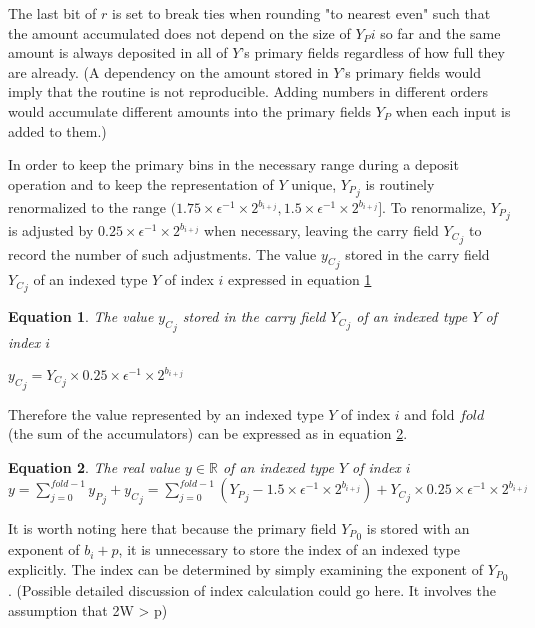 \documentclass[12pt]{article}
\providecommand{\R}{\ensuremath{\mathbb{R}}}
\theoremstyle{plain}
\newtheorem{eq}{Equation}[section]
\begin{document}
      The last bit of $r$ is set to break ties when rounding "to nearest even" such that the amount accumulated does not depend on the size of ${Y_P}i$ so far and the same amount is always deposited in all of $Y$'s primary fields regardless of how full they are already. (A dependency on the amount stored in $Y$'s primary fields would imply that the routine is not reproducible. Adding numbers in different orders would accumulate different amounts into the primary fields $Y_P$ when each input is added to them.)

      In order to keep the primary bins in the necessary range during a deposit operation and to keep the representation of $Y$ unique, ${Y_P}_j$ is routinely renormalized to the range $(1.75 \times\epsilon^{-1} \times2^{b_{i + j}}, 1.5 \times\epsilon^{-1} \times2^{b_{i + j}}]$.
      To renormalize, ${Y_P}_j$ is adjusted by $0.25 \times\epsilon^{-1} \times 2^{b_{i + j}}$ when necessary, leaving the carry field ${Y_C}_j$ to record the number of such adjustments.
      The value ${y_C}_j$ stored in the carry field ${Y_C}_j$ of an indexed type $Y$ of index $i$ expressed in equation \ref{eq:car}
      \begin{eq} The value ${y_C}_j$ stored in the carry field ${Y_C}_j$ of an indexed type $Y$ of index $i$

        ${y_C}_j = {Y_C}_j \times 0.25\times\epsilon^{-1}\times2^{b_{i + j}}$
        \label{eq:car}
      \end{eq}
 Therefore the value represented by an indexed type $Y$ of index $i$ and fold $fold$ (the sum of the accumulators) can be expressed as in equation \ref{eq:indexedvalue}.
      \begin{eq} The real value $y \in \R$ of an indexed type $Y$ of index $i$
\
        $y = \sum\limits_{j = 0}^{fold - 1} {y_P}_j + {y_C}_j = \sum\limits_{j = 0}^{fold - 1} ({Y_P}_j - 1.5 \times\epsilon^{-1}\times 2^{b_{i + j}}) + {Y_C}_j \times 0.25\times\epsilon^{-1}\times2^{b_{i + j}}$
        \label{eq:indexedvalue}
      \end{eq}
      It is worth noting here that because the primary field ${Y_P}_0$ is stored with an exponent of $b_i + p$, it is unnecessary to store the index of an indexed type explicitly. The index can be determined by simply examining the exponent of ${Y_P}_0$. (Possible detailed discussion of index calculation could go here. It involves the assumption that 2W > p)
\end{document}
